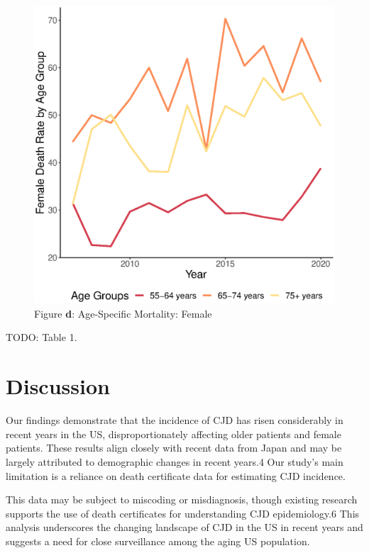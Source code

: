 \documentclass[12pt]{article}
\begin{document}
\begin{figure}
    \centering
    \includegraphics[scale=0.5]{analysis/output/female_age_specific_deaths_plot.eps}
    \caption{Figure \textbf{d}: Age-Specific Mortality: Female}
    \label{fig:female_age_specific_deaths}
\end{figure}

TODO: Table 1.

\section*{Discussion}
 
\par \bigskip
\noindent Our findings demonstrate that the incidence of CJD has risen considerably in recent years in the US, disproportionately affecting older patients and female patients. These results align closely with recent data from Japan and may be largely attributed to demographic changes in recent years.4 Our study’s main limitation is a reliance on death certificate data for estimating CJD incidence.

\par \bigskip
\noindent This data may be subject to miscoding or misdiagnosis, though existing research supports the use of death certificates for understanding CJD epidemiology.6 This analysis underscores the changing landscape of CJD in the US in recent years and suggests a need for close surveillance among the aging US population.  




\end{document}
